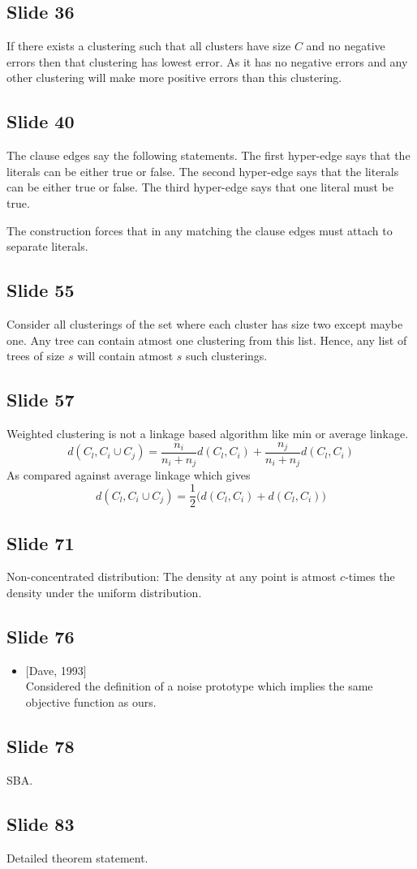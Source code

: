 \documentclass[12pt]{article}
\begin{document}
\subsection*{Slide 36}
If there exists a clustering such that all clusters have size $C$ and no negative errors then that clustering has lowest error. As it has no negative errors and any other clustering will make more positive errors than this clustering. 

\subsection*{Slide 40}
The clause edges say the following statements. The first hyper-edge says that the literals can be either true or false. The second hyper-edge says that the literals can be either true or false. The third hyper-edge says that one literal must be true.

The construction forces that in any matching the clause edges must attach to separate literals. 

\subsection*{Slide 55}
Consider all clusterings of the set where each cluster has size two except maybe one. Any tree can contain atmost one clustering from this list. Hence, any list of trees of size $s$ will contain atmost $s$ such clusterings.


\subsection*{Slide 57}
Weighted clustering is not a linkage based algorithm like min or average linkage. 
$$d(C_l, C_i \cup C_j) = \frac{n_i}{n_i + n_j} d(C_l, C_i) + \frac{n_j}{n_i+n_j}d(C_l, C_i)$$
As compared against average linkage which gives
$$d(C_l, C_i \cup C_j) = \frac{1}{2} \Big(d(C_l, C_i) + d(C_l, C_i) \Big)$$

\subsection*{Slide 71}
Non-concentrated distribution: The density at any point is atmost $c$-times the density under the uniform distribution.

\subsection*{Slide 76}
\begin{itemize}
	\item $[$Dave, 1993$]$\\
	Considered the definition of a noise prototype which implies the same objective function as ours.
\end{itemize}

\subsection*{Slide 78}
SBA.

\subsection*{Slide 83}
Detailed theorem statement.
\end{document}
